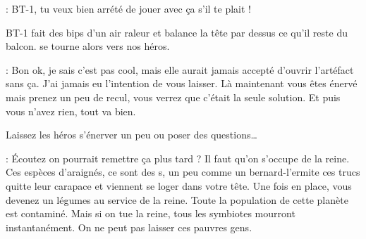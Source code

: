 \begin{quotebox}
\noindent\textbf{}: BT-1, tu veux bien arrété de jouer avec ça s’il te plait !
\end{quotebox}
BT-1 fait des bips d’un air raleur et balance la tête par dessus ce qu’il reste du balcon.  se tourne alors vers nos héros.
\begin{quotebox}
\noindent\textbf{}: Bon ok, je sais c’est pas cool, mais elle aurait jamais accepté d’ouvrir l’artéfact sans ça. J’ai jamais eu l’intention de vous laisser. Là maintenant vous êtes énervé mais prenez un peu de recul, vous verrez que c’était la seule solution. Et puis vous n’avez rien, tout va bien.
\end{quotebox}
Laissez les héros s’énerver un peu ou poser des questions\dots
\begin{quotebox}
\noindent\textbf{}: \'Ecoutez on pourrait remettre ça plus tard ? Il faut qu’on s’occupe de la reine. Ces espèces d’araignés, ce sont des s, un peu comme un bernard-l’ermite ces trucs quitte leur carapace et viennent se loger dans votre tête. Une fois en place, vous devenez un légumes au service de la reine. Toute la population de cette planète est contaminé. Mais si on tue la reine, tous les symbiotes mourront instantanément. On ne peut pas laisser ces pauvres gens.
\end{quotebox}
